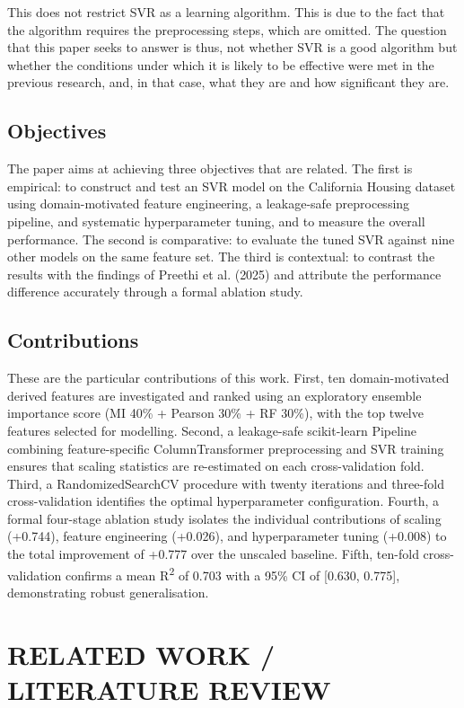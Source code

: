 \documentclass[pdflatex,sn-mathphys-num]{sn-jnl}
\begin{document}
This does not restrict SVR as a learning algorithm. This is due to the fact that the algorithm requires the preprocessing steps, which are omitted. The question that this paper seeks to answer is thus, not whether SVR is a good algorithm but whether the conditions under which it is likely to be effective were met in the previous research, and, in that case, what they are and how significant they are.


\subsection{Objectives}
The paper aims at achieving three objectives that are related. The first is empirical: to construct and test an SVR model on the California Housing dataset using domain-motivated feature engineering, a leakage-safe preprocessing pipeline, and systematic hyperparameter tuning, and to measure the overall performance. The second is comparative: to evaluate the tuned SVR against nine other models on the same feature set. The third is contextual: to contrast the results with the findings of Preethi et al. (2025) and attribute the performance difference accurately through a formal ablation study.

\subsection{Contributions}
These are the particular contributions of this work. First, ten domain-motivated derived features are investigated and ranked using an exploratory ensemble importance score (MI 40\% + Pearson 30\% + RF 30\%), with the top twelve features selected for modelling. Second, a leakage-safe scikit-learn Pipeline combining feature-specific ColumnTransformer preprocessing and SVR training ensures that scaling statistics are re-estimated on each cross-validation fold. Third, a RandomizedSearchCV procedure with twenty iterations and three-fold cross-validation identifies the optimal hyperparameter configuration. Fourth, a formal four-stage ablation study isolates the individual contributions of scaling (+0.744), feature engineering (+0.026), and hyperparameter tuning (+0.008) to the total improvement of +0.777 over the unscaled baseline. Fifth, ten-fold cross-validation confirms a mean R\textsuperscript{2} of 0.703 with a 95\% CI of [0.630, 0.775], demonstrating robust generalisation.


\section{RELATED WORK / LITERATURE REVIEW}
\end{document}
